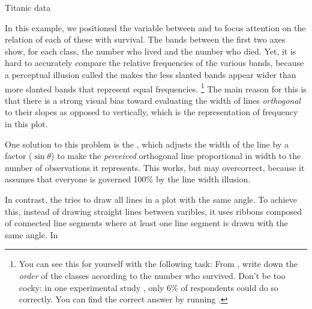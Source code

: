 \documentclass[11pt]{book}\usepackage[]{graphicx}\usepackage[]{color}
\newenvironment{knitrout}{}{} %
\renewenvironment{knitrout}{\small\renewcommand{\baselinestretch}{.85}}{} %
\begin{document}
\begin{Example}{Titanic data}
\begin{knitrout}
\end{knitrout}

In this example, we positioned the variable  between
 and  to focus attention on the relation of each
of these with survival.  The bands between the 
first two axes show, for each class, the number who lived and the number who
died.
Yet, it is hard to accurately compare the relative frequencies of the
various bands, because a perceptual illusion called the 
makes the less slanted bands appear wider than more slanted bands that represent
equal frequencies.%
\footnote{
You can see this for yourself with the following task: From ,
write down the \emph{order} of the classes according to the number who survived.
Don't be too cocky: in one experimental study \citep{HofmannVendettuoli:2013},
only 6\% of respondents could do so correctly.
You can find the correct answer by running .
}
The main reason for this is that
there is a strong visual bias toward evaluating
the width of lines \emph{orthogonal} to their slopes as opposed to vertically,
which is the representation of frequency in this plot.

\end{Example}

One solution to this problem is the 
\citep{Schonlau:2003}, which adjusts the width of the line
by a factor ($\sin \theta$) to make the 
\emph{perceived} orthogonal line
proportional in width  to the number of observations it represents.
This works, but may overcorrect, because it assumes that everyone
is governed 100\% by the line width illusion. 

In contrast, the  \citep{HofmannVendettuoli:2013}
tries to draw all lines in a plot with the same angle.
To achieve this, instead of drawing straight lines between varibles, it
uses ribbons composed of connected line segments where at least one
line segment is drawn with the same angle. In 
\end{document}
